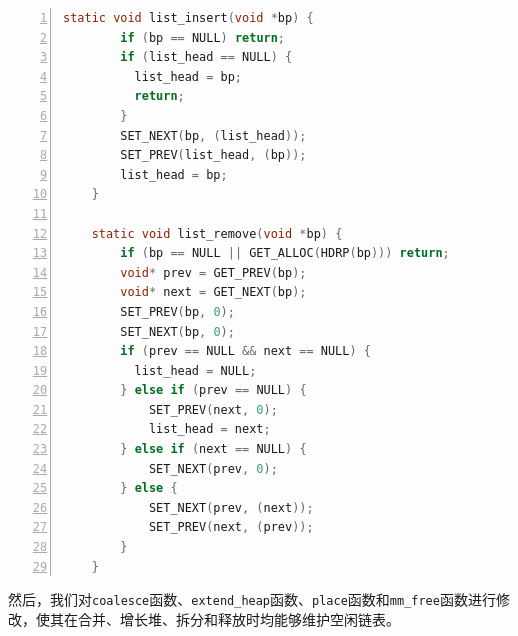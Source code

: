 \documentclass{article}
\begin{document}
\begin{lstlisting}[xleftmargin = 4em,xrightmargin = 4em, aboveskip = 1em, numbers = left, language = C]
    static void list_insert(void *bp) {
        if (bp == NULL) return;
        if (list_head == NULL) {
          list_head = bp;
          return;
        }
        SET_NEXT(bp, (list_head));
        SET_PREV(list_head, (bp));
        list_head = bp;
    }
    
    static void list_remove(void *bp) {
        if (bp == NULL || GET_ALLOC(HDRP(bp))) return;
        void* prev = GET_PREV(bp);
        void* next = GET_NEXT(bp);
        SET_PREV(bp, 0);
        SET_NEXT(bp, 0);
        if (prev == NULL && next == NULL) {
          list_head = NULL;
        } else if (prev == NULL) {
            SET_PREV(next, 0);
            list_head = next;
        } else if (next == NULL) {
            SET_NEXT(prev, 0);
        } else {
            SET_NEXT(prev, (next));
            SET_PREV(next, (prev));
        } 
    }
\end{lstlisting}

然后，我们对\texttt{coalesce}函数、\texttt{extend\_heap}函数、\texttt{place}函数和\texttt{mm\_free}函数进行修改，使其在合并、增长堆、拆分和释放时均能够维护空闲链表。
\end{document}
